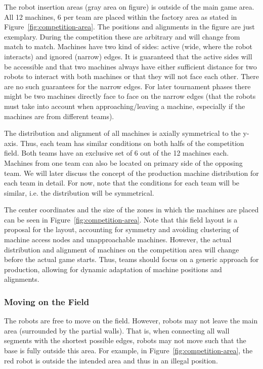 \documentclass[12pt,twoside]{article}
\newcommand{\reffig}[1]{Figure~\ref{#1}}
\begin{document}
The robot insertion areas (gray area on figure) is outside of the main
game area. All 12 machines, 6 per team are placed within the factory
area as stated in \reffig{fig:competition-area}. The positions and
alignments in the figure are just exemplary. During the competition
these are arbitrary and will change from match to match.  Machines
have two kind of sides: active (wide, where the robot interacts) and
ignored (narrow) edges.  It is guaranteed that the active sides will
be accessible and that two machines always have either sufficient
distance for two robots to interact with both machines or that they
will not face each other. There are no such guarantees for the narrow
edges. For later tournament phases there might be two machines
directly face to face on the narrow edges (that the robots must take
into account when approaching/leaving a machine, especially if the
machines are from different teams).

The distribution and alignment of all machines is axially symmetrical
to the y-axis. Thus, each team has similar conditions on both halfs of
the competition field. Both teams have an exclusive set of 6 out of
the 12 machines each. Machines from one team can also be located on
primary side of the opposing team. We will later discuss the concept
of the production machine distribution for each team in detail. For
now, note that the conditions for each team will be similar, i.e. the
distribution will be symmetrical.

The center coordinates and the size of the zones in which the machines
are placed can be seen in \reffig{fig:competition-area}. Note that
this field layout is a proposal for the layout, accounting for
symmetry and avoiding clustering of machine access nodes and
unapproachable machines. However, the actual distribution and alignment 
of machines on the competition area will change before the actual game 
starts. Thus, teams should focus on a generic approach for production, 
allowing for dynamic adaptation of machine positions and alignments.

\subsubsection{Moving on the Field}
\label{sec:field-movement}
The robots are free to move on the field. However, robots may not
leave the main area (surrounded by the partial walls). That is, when
connecting all wall segments with the shortest possible edges, robots
may not move such that the base is fully outside this area. For
example, in \reffig{fig:competition-area}, the red robot is outside
the intended area and thus in an illegal position.
\end{document}
